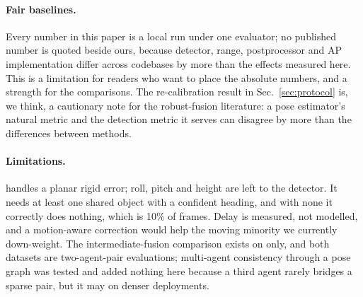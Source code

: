 \paragraph{Fair baselines.}
Every number in this paper is a local run under one evaluator; no published number is quoted beside ours, because detector, range, postprocessor and AP implementation differ across codebases by more than the effects measured here. This is a limitation for readers who want to place the absolute numbers, and a strength for the comparisons. The \freealign re-calibration result in Sec.~\ref{sec:protocol} is, we think, a cautionary note for the robust-fusion literature: a pose estimator's natural metric and the detection metric it serves can disagree by more than the differences between methods.

\paragraph{Limitations.}
\paper handles a planar rigid error; roll, pitch and height are left to the detector. It needs at least one shared object with a confident heading, and with none it correctly does nothing, which is 10\% of \vxreal frames. Delay is measured, not modelled, and a motion-aware correction would help the moving minority we currently down-weight. The intermediate-fusion comparison exists on \opvv only, and both datasets are two-agent-pair evaluations; multi-agent consistency through a pose graph was tested and added nothing here because a third agent rarely bridges a sparse pair, but it may on denser deployments.
